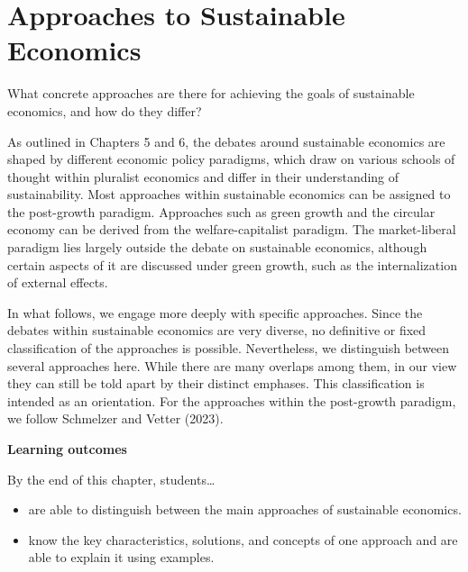 \documentclass[
  british,
  a4paper,
  DIV=11,
  numbers=noendperiod,
  oneside,
  openany]{scrreprt}
\providecommand{\tightlist}{%
  \setlength{\itemsep}{0pt}\setlength{\parskip}{0pt}}
\begin{document}
\chapter{Approaches to Sustainable
Economics}\label{approaches-to-sustainable-economics}

\begin{tcolorbox}[enhanced jigsaw, arc=.35mm, bottomrule=.15mm, bottomtitle=1mm, breakable, colback=white, colbacktitle=quarto-callout-note-color!10!white, colframe=quarto-callout-note-color-frame, coltitle=black, left=2mm, leftrule=.75mm, opacityback=0, opacitybacktitle=0.6, rightrule=.15mm, title={Guiding question}, titlerule=0mm, toprule=.15mm, toptitle=1mm]

What concrete approaches are there for achieving the goals of
sustainable economics, and how do they differ?

\end{tcolorbox}

As outlined in Chapters 5 and 6, the debates around sustainable
economics are shaped by different economic policy paradigms, which draw
on various schools of thought within pluralist economics and differ in
their understanding of sustainability. Most approaches within
sustainable economics can be assigned to the post-growth paradigm.
Approaches such as green growth and the circular economy can be derived
from the welfare-capitalist paradigm. The market-liberal paradigm lies
largely outside the debate on sustainable economics, although certain
aspects of it are discussed under green growth, such as the
internalization of external effects.

In what follows, we engage more deeply with specific approaches. Since
the debates within sustainable economics are very diverse, no definitive
or fixed classification of the approaches is possible. Nevertheless, we
distinguish between several approaches here. While there are many
overlaps among them, in our view they can still be told apart by their
distinct emphases. This classification is intended as an orientation.
For the approaches within the post-growth paradigm, we follow Schmelzer
and Vetter (2023).

\textbf{Learning outcomes}

By the end of this chapter, students\ldots{}

\begin{itemize}
\tightlist
\item
  are able to distinguish between the main approaches of sustainable
  economics.
\item
  know the key characteristics, solutions, and concepts of one approach
  and are able to explain it using examples.
\end{itemize}
\end{document}
